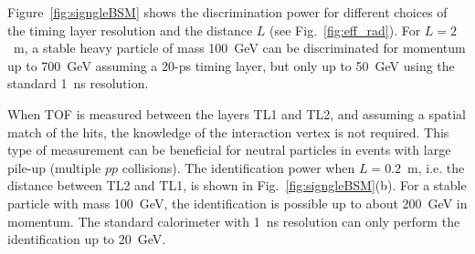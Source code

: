 Figure~\ref{fig:signgleBSM} shows the discrimination power for different choices of the timing layer resolution
and the distance $L$ (see Fig.~\ref{fig:eff_rad}).
For $L=2$~m, a stable heavy particle of mass 100~GeV can be discriminated for momentum up to 
700~GeV assuming a 20-ps timing layer,
but only up to 50~GeV using the standard 1~ns resolution.

When  TOF is measured between the layers TL1 and TL2, and assuming a spatial match of the hits, the knowledge of the interaction vertex is not required.
This type of measurement can be beneficial for neutral particles in events with large pile-up (multiple $pp$ collisions).
The identification power when $L=0.2$~m, i.e. the distance between TL2 and TL1, is shown in Fig.~\ref{fig:signgleBSM}(b).
For a stable particle with mass 100~GeV, the identification is possible up to about 200~GeV in momentum. The standard calorimeter with
1~ns resolution can only perform the identification up to $20$~GeV. 
